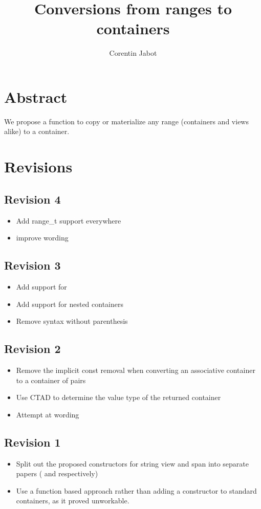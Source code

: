 \documentclass{wg21}
\title{Conversions from ranges to containers}
\author{Corentin Jabot}{corentin.jabot@gmail.com}
\begin{document}
\maketitle

\section{Abstract}

We propose a function to copy or materialize any range (containers and views alike) to a container.

\section{Revisions}

\subsection*{Revision 4}
\begin{itemize}
    \item Add range_t support everywhere
    \item improve wording
\end{itemize}

\subsection*{Revision 3}
\begin{itemize}
    \item Add support for 
    \item Add support for nested containers
    \item Remove syntax without parenthesis
\end{itemize}

\subsection*{Revision 2}
\begin{itemize}
	\item Remove the implicit const removal when converting an associative container to a container of pairs
	\item Use CTAD to determine the value type of the returned container
	\item Attempt at wording
\end{itemize}

\subsection*{Revision 1}
\begin{itemize}
	\item Split out the proposed constructors for string view and span into separate papers (\cite{P1391} and \cite{P1394} respectively)
	\item Use a function based approach rather than adding a constructor to standard containers, as it proved unworkable.
\end{itemize}
\end{document}
